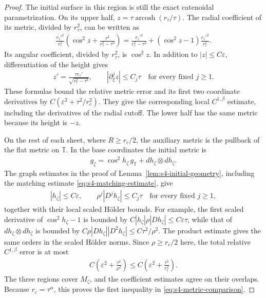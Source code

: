\documentclass[a4paper,11pt,oneside,reqno]{amsart}
\numberwithin{equation}{section}
\theoremstyle{definition}
\begin{document}
\begin{proof}
    The initial surface in this region is still the exact
    catenoidal parametrization. On its upper half,
    $z=\tau\operatorname{arcosh}(r_\tau/\tau)$.
    The radial coefficient of its metric, divided by
    $r_\tau^2$, can be written as
    \begin{align*}
        \frac{r_\tau'^2}{r_\tau^2}
        \left(\cos^2z+
        \frac{\tau^2}{r_\tau^2-\tau^2}\right)
        =\frac{r_\tau'^2}{r_\tau^2-\tau^2}
        +(\cos^2z-1)\frac{r_\tau'^2}{r_\tau^2}.
    \end{align*}
    Its angular coefficient, divided by $r_\tau^2$, is
    $\cos^2z$. In addition to $|z|\leq C\varepsilon$,
    differentiation of the height gives
    \begin{align*}
        z'=\frac{\tau r_\tau'}
        {\sqrt{r_\tau^2-\tau^2}},
        \qquad |\partial_\xi^j z|\leq C_j\tau
        \quad\text{for every fixed }j\geq1.
    \end{align*}
    These formulas bound the relative metric error and
    its first two coordinate derivatives by
    $C(\varepsilon^2+\tau^2/r_c^2)$. They give the
    corresponding local $C^{1,\beta}$ estimate, including
    the derivatives of the radial cutoff. The lower half
    has the same metric because its height is $-z$.

    On the rest of each sheet, where $R\geq r_c/2$,
    the auxiliary metric is the pullback of the flat
    metric on $\mathbb T$. In the base coordinates the
    initial metric is
    \begin{align*}
        g_\zeta=\cos^2h_\zeta\,g_{\mathbb T}
        +dh_\zeta\otimes dh_\zeta.
    \end{align*}
    The graph estimates in the proof of
    Lemma~\ref{lem:s4-initial-geometry}, including the
    matching estimate \eqref{eq:s4-matching-estimate},
    give
    \begin{align*}
        |h_\zeta|\leq C\varepsilon,
        \qquad
        \rho^j|D^jh_\zeta|\leq C_j\tau
        \quad\text{for every fixed }j\geq1,
    \end{align*}
    together with their local scaled H\"older bounds.
    For example, the first scaled derivative of
    $\cos^2h_\zeta-1$ is bounded by
    $C|h_\zeta|\rho|Dh_\zeta|\leq C\varepsilon\tau$,
    while that of $dh_\zeta\otimes dh_\zeta$ is bounded by
    $C\rho|Dh_\zeta||D^2h_\zeta|
    \leq C\tau^2/\rho^2$.
    The product estimate gives the same orders in the
    scaled H\"older norms. Since $\rho\geq r_c/2$ here,
    the total relative $C^{1,\beta}$ error is at most
    \begin{align*}
        C\left(\varepsilon^2+\frac{\tau^2}{\rho^2}\right)
        \leq C\left(\varepsilon^2+
        \frac{\tau^2}{r_c^2}\right).
    \end{align*}
    The three regions cover $M_\zeta$, and the coefficient
    estimates agree on their overlaps. Because
    $r_c=\tau^\alpha$, this proves the first inequality in
    \eqref{eq:s4-metric-comparison}.


\end{proof}
\end{document}
